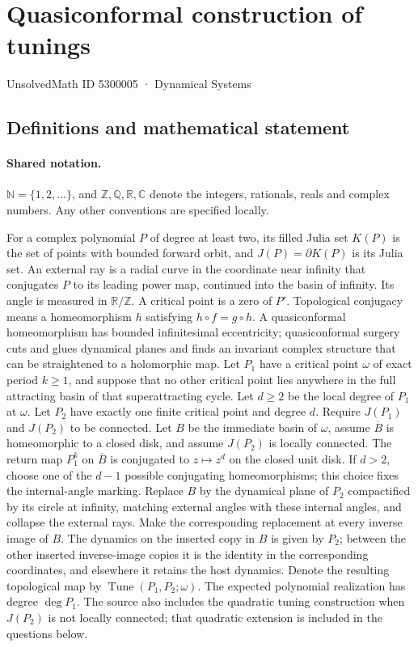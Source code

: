 \documentclass[11pt]{article}
\begin{document}
\setcounter{section}{5300004}
\section{Quasiconformal construction of tunings}\label{5300005}
{\small\sffamily UnsolvedMath ID 5300005 · Dynamical Systems}
\subsection{Definitions and mathematical statement}

\paragraph{Shared notation.}$\mathbb N=\{1,2,\ldots\}$, and $\mathbb Z,\mathbb Q,\mathbb R,\mathbb C$ denote the integers, rationals, reals and complex numbers. Any other conventions are specified locally.


For a complex polynomial $P$ of degree at least two, its filled Julia set $K(P)$ is the set of points with bounded forward orbit, and $J(P)=\partial K(P)$ is its Julia set. An external ray is a radial curve in the coordinate near infinity that conjugates $P$ to its leading power map, continued into the basin of infinity. Its angle is measured in $\mathbb R/\mathbb Z$. A critical point is a zero of $P'$. Topological conjugacy means a homeomorphism $h$ satisfying $h\circ f=g\circ h$. A quasiconformal homeomorphism has bounded infinitesimal eccentricity; quasiconformal surgery cuts and glues dynamical planes and finds an invariant complex structure that can be straightened to a holomorphic map.
Let $P_1$ have a critical point $\omega$ of exact period $k\geq1$, and suppose that no other critical point lies anywhere in the full attracting basin of that superattracting cycle. Let $d\geq2$ be the local degree of $P_1$ at $\omega$. Let $P_2$ have exactly one finite critical point and degree $d$. Require $J(P_1)$ and $J(P_2)$ to be connected. Let $B$ be the immediate basin of $\omega$, assume $\overline B$ is homeomorphic to a closed disk, and assume $J(P_2)$ is locally connected. The return map $P_1^k$ on $\overline B$ is conjugated to $z\mapsto z^d$ on the closed unit disk. If $d>2$, choose one of the $d-1$ possible conjugating homeomorphisms; this choice fixes the internal-angle marking.
Replace $B$ by the dynamical plane of $P_2$ compactified by its circle at infinity, matching external angles with these internal angles, and collapse the external rays. Make the corresponding replacement at every inverse image of $B$. The dynamics on the inserted copy in $B$ is given by $P_2$; between the other inserted inverse-image copies it is the identity in the corresponding coordinates, and elsewhere it retains the host dynamics. Denote the resulting topological map by $\operatorname{Tune}(P_1,P_2;\omega)$. The expected polynomial realization has degree $\deg P_1$. The source also includes the quadratic tuning construction when $J(P_2)$ is not locally connected; that quadratic extension is included in the questions below.
\end{document}
